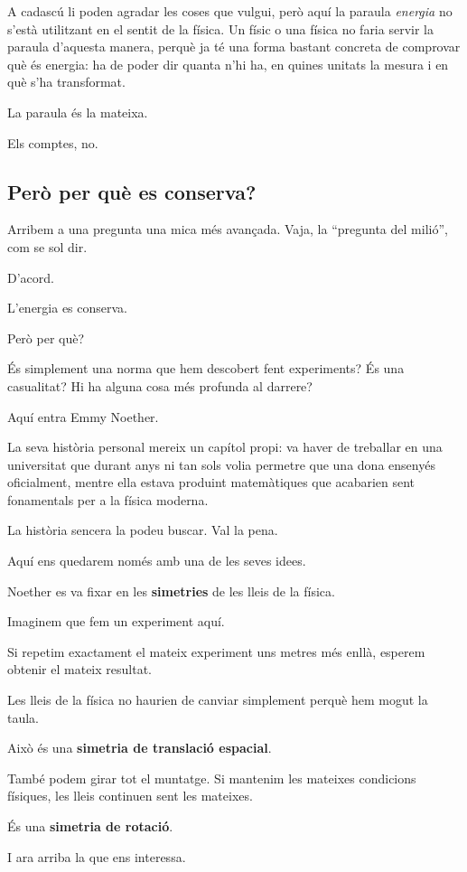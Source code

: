A cadascú li poden agradar les coses que vulgui, però aquí la paraula \textit{energia} no s'està utilitzant en el sentit de la física. Un físic o una física no faria servir la paraula d'aquesta manera, perquè ja té una forma bastant concreta de comprovar què és energia: ha de poder dir quanta n'hi ha, en quines unitats la mesura i en què s'ha transformat.

La paraula és la mateixa.

Els comptes, no.

\subsection{Però per què es conserva?}

Arribem a una pregunta una mica més avançada. Vaja, la ``pregunta del milió'', com se sol dir.

D'acord.

L'energia es conserva.

Però per què?

És simplement una norma que hem descobert fent experiments? És una casualitat? Hi ha alguna cosa més profunda al darrere?

Aquí entra Emmy Noether.

La seva història personal mereix un capítol propi: va haver de treballar en una universitat que durant anys ni tan sols volia permetre que una dona ensenyés oficialment, mentre ella estava produint matemàtiques que acabarien sent fonamentals per a la física moderna.

La història sencera la podeu buscar. Val la pena.

Aquí ens quedarem només amb una de les seves idees.

Noether es va fixar en les \textbf{simetries} de les lleis de la física.

Imaginem que fem un experiment aquí.

Si repetim exactament el mateix experiment uns metres més enllà, esperem obtenir el mateix resultat.

Les lleis de la física no haurien de canviar simplement perquè hem mogut la taula.

Això és una \textbf{simetria de translació espacial}.

També podem girar tot el muntatge. Si mantenim les mateixes condicions físiques, les lleis continuen sent les mateixes.

És una \textbf{simetria de rotació}.

I ara arriba la que ens interessa.

